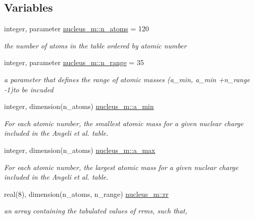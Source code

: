 \subsection*{Variables}
\begin{DoxyCompactItemize}
\item 
integer, parameter \mbox{\hyperlink{namespacenucleus__m_a97ff520812e294bf26a6b2c330f211e5}{nucleus\+\_\+m\+::n\+\_\+atoms}} = 120
\begin{DoxyCompactList}\small\item\em the number of atoms in the table ordered by atomic number \end{DoxyCompactList}\item 
integer, parameter \mbox{\hyperlink{namespacenucleus__m_adf953c9196f6870fe5e502b4f40bea48}{nucleus\+\_\+m\+::n\+\_\+range}} = 35
\begin{DoxyCompactList}\small\item\em a parameter that defines the range of atomic masses (a\+\_\+min, a\+\_\+min +n\+\_\+range -\/1)to be incuded \end{DoxyCompactList}\item 
integer, dimension(n\+\_\+atoms) \mbox{\hyperlink{namespacenucleus__m_a8541e730d34d4c5cbb0ca885c9c5cc35}{nucleus\+\_\+m\+::a\+\_\+min}}
\begin{DoxyCompactList}\small\item\em For each atomic number, the smallest atomic mass for a given nuclear charge included in the Angeli et al. table. \end{DoxyCompactList}\item 
integer, dimension(n\+\_\+atoms) \mbox{\hyperlink{namespacenucleus__m_ac8aa001386cf3938a2be5b5ec45d0c8d}{nucleus\+\_\+m\+::a\+\_\+max}}
\begin{DoxyCompactList}\small\item\em For each atomic number, the largest atomic mass for a given nuclear charge included in the Angeli et al. table. \end{DoxyCompactList}\item 
real(8), dimension(n\+\_\+atoms, n\+\_\+range) \mbox{\hyperlink{namespacenucleus__m_aadb2a0e0828722e6e3f118cdf1b07f50}{nucleus\+\_\+m\+::rr}}
\begin{DoxyCompactList}\small\item\em an array containing the tabulated values of rrms, such that, \end{DoxyCompactList}\end{DoxyCompactItemize}


